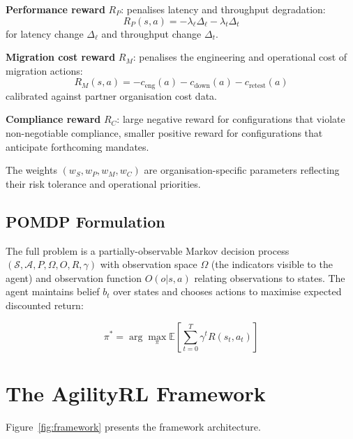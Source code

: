 \documentclass[sigconf,nonacm]{acmart}
\begin{document}
\textbf{Performance reward} $R_P$: penalises latency and throughput
degradation:
\begin{equation}
  R_P(s,a) = -\lambda_\ell \Delta_\ell - \lambda_t \Delta_t
\end{equation}
for latency change $\Delta_\ell$ and throughput change $\Delta_t$.

\textbf{Migration cost reward} $R_M$: penalises the engineering and
operational cost of migration actions:
\begin{equation}
  R_M(s,a) = -c_{\text{eng}}(a) - c_{\text{down}}(a) - c_{\text{retest}}(a)
\end{equation}
calibrated against partner organisation cost data.

\textbf{Compliance reward} $R_C$: large negative reward for
configurations that violate non-negotiable compliance, smaller
positive reward for configurations that anticipate forthcoming
mandates.

The weights $(w_S, w_P, w_M, w_C)$ are organisation-specific
parameters reflecting their risk tolerance and operational priorities.

\subsection{POMDP Formulation}

The full problem is a partially-observable Markov decision process
$(\mathcal{S}, \mathcal{A}, P, \Omega, O, R, \gamma)$ with
observation space $\Omega$ (the indicators visible to the agent) and
observation function $O(o|s,a)$ relating observations to states. The
agent maintains belief $b_t$ over states and chooses actions to
maximise expected discounted return:

\begin{equation}
  \pi^* = \arg\max_\pi \mathbb{E}\left[\sum_{t=0}^{T} \gamma^t R(s_t, a_t)\right]
\end{equation}

\section{The AgilityRL Framework}

Figure~\ref{fig:framework} presents the framework architecture.
\end{document}
